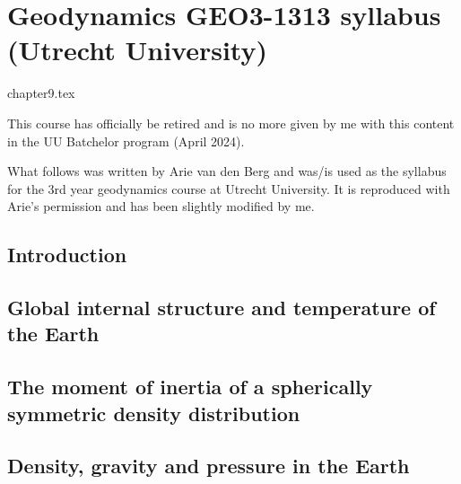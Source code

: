 \chapter{Geodynamics GEO3-1313 syllabus (Utrecht University)} %

\begin{flushright} {\tiny {\color{gray} chapter9.tex}} \end{flushright}


\begin{center}
{\Large \color{teal} This course has officially be retired and is no more given by me 
with this content in the UU Batchelor program (April 2024).}
\end{center}

What follows was written by Arie van den Berg and was/is used as the syllabus for the 
3rd year geodynamics course at Utrecht University. It is reproduced with Arie's permission
and has been slightly modified by me.

\section{Introduction} 
 

\section{Global internal structure and temperature of the Earth} 
 

\section{The moment of inertia of a spherically symmetric density distribution} 
\label{sect_scalarmomint}  

\newpage
\section{Density, gravity and pressure in the Earth} 
\label{section_Density-gravity-pressure}  


